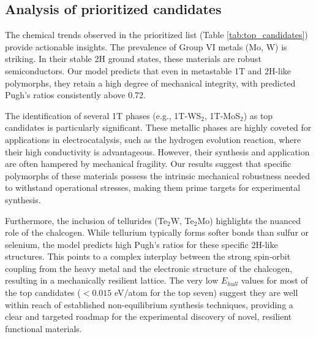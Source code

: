 \documentclass[]{article}
\begin{document}
\subsection{Analysis of prioritized candidates}

The chemical trends observed in the prioritized list (Table \ref{tab:top_candidates}) provide actionable insights. The prevalence of Group VI metals (Mo, W) is striking. In their stable 2H ground states, these materials are robust semiconductors. Our model predicts that even in metastable 1T and 2H-like polymorphs, they retain a high degree of mechanical integrity, with predicted Pugh's ratios consistently above 0.72.

The identification of several 1T phases (e.g., 1T-WS$_2$, 1T-MoS$_2$) as top candidates is particularly significant. These metallic phases are highly coveted for applications in electrocatalysis, such as the hydrogen evolution reaction, where their high conductivity is advantageous. However, their synthesis and application are often hampered by mechanical fragility. Our results suggest that specific polymorphs of these materials possess the intrinsic mechanical robustness needed to withstand operational stresses, making them prime targets for experimental synthesis.

Furthermore, the inclusion of tellurides (Te$_2$W, Te$_2$Mo) highlights the nuanced role of the chalcogen. While tellurium typically forms softer bonds than sulfur or selenium, the model predicts high Pugh's ratios for these specific 2H-like structures. This points to a complex interplay between the strong spin-orbit coupling from the heavy metal and the electronic structure of the chalcogen, resulting in a mechanically resilient lattice. The very low $E_{hull}$ values for most of the top candidates ($<0.015$ eV/atom for the top seven) suggest they are well within reach of established non-equilibrium synthesis techniques, providing a clear and targeted roadmap for the experimental discovery of novel, resilient functional materials.
\end{document}
